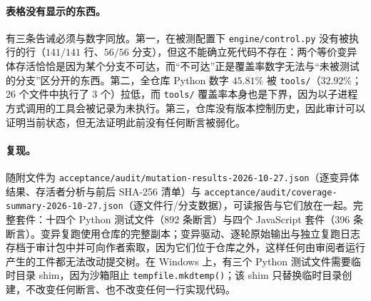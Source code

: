 \paragraph{表格没有显示的东西。} 有三条告诫必须与数字同放。第一，在被测配置下 \texttt{engine/control.py} 没有被执行的行（$141/141$ 行、$56/56$ 分支），但这不能确立死代码不存在：两个等价变异体存活恰恰是因为某个分支不可达，而“不可达”正是覆盖率数字无法与“未被测试的分支”区分开的东西。第二，全仓库 Python 数字 $45.81\%$ 被 \texttt{tools/}（$32.92\%$；26 个文件中执行了 3 个）拉低，而 \texttt{tools/} 覆盖率本身也是下界，因为以子进程方式调用的工具会被记录为未执行。第三，仓库没有版本控制历史，因此审计可以证明当前状态，但无法证明此前没有任何断言被弱化。

\paragraph{复现。} 随附文件为 \texttt{acceptance/\allowbreak{}audit/\allowbreak{}mutation-\allowbreak{}results-\allowbreak{}2026-\allowbreak{}10-\allowbreak{}27.\allowbreak{}json}（逐变异体结果、存活者分析与前后 SHA-256 清单）与 \texttt{acceptance/\allowbreak{}audit/\allowbreak{}coverage-\allowbreak{}summary-\allowbreak{}2026-\allowbreak{}10-\allowbreak{}27.\allowbreak{}json}（逐文件行/分支数据），可读报告与它们放在一起。完整套件：十四个 Python 测试文件（892 条断言）与四个 JavaScript 套件（396 条断言）。变异复跑使用仓库的完整副本；变异驱动、逐轮原始输出与独立复跑日志存档于审计包中并可向作者索取，因为它们位于仓库之外，这样任何由审阅者运行产生的工件都无法改动提交树。在 Windows 上，有三个 Python 测试文件需要临时目录 shim，因为沙箱阻止 \texttt{tempfile.\allowbreak{}mkdtemp()}；该 shim 只替换临时目录创建，不改变任何断言、也不改变任何一行实现代码。
